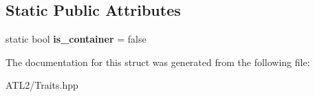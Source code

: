 \subsection*{Static Public Attributes}
\begin{DoxyCompactItemize}
\item 
\hypertarget{structatl_1_1_container_trait_a3a7a13c226a00d1924a459a4a11e7b63}{static bool {\bfseries is\+\_\+container} = false}\label{structatl_1_1_container_trait_a3a7a13c226a00d1924a459a4a11e7b63}

\end{DoxyCompactItemize}


The documentation for this struct was generated from the following file\+:\begin{DoxyCompactItemize}
\item 
A\+T\+L2/Traits.\+hpp\end{DoxyCompactItemize}
